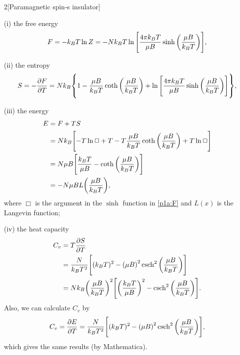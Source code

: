 \documentclass[12pt]{article}
\begin{document}
\begin{problem}{2}[Paramagnetic spin-s insulator]
\begin{solution}
(i) the free energy
\begin{equation}\label{p1a:F}
    F=-k_BT\ln Z=-Nk_BT\ln\qty[\frac{4\pi k_BT}{\mu B}\sinh\qty(\frac{\mu
    B}{k_BT})],
\end{equation}

(ii) the entropy
\begin{equation}
    S=-\frac{\partial F}{\partial T} 
    =Nk_B\qty{1-\frac{\mu B}{k_BT}\coth\qty(\frac{\mu B}{k_BT})
    +\ln\qty[\frac{4\pi k_BT}{\mu B}\sinh\qty(\frac{\mu B}{k_BT})]},
\end{equation}

(iii) the energy
\begin{align}\label{p2a:E}
    E
    &=F+TS\notag\\
    &=Nk_B\qty[-T\ln\Box+T-T\frac{\mu B}{k_BT}\coth\qty(\frac{\mu B}{k_BT})
    +T\ln\Box]\notag\\
    &=N\mu B\qty[\frac{k_BT}{\mu B}-\coth\qty(\frac{\mu B}{k_BT})]\notag\\
    &=-N\mu BL\qty(\frac{\mu B}{k_BT}),
\end{align}
where $\Box$ is the argument in the $\sinh$ function in \eqref{p1a:F} and
$L(x)$ is the Langevin function;

(iv) the heat capacity
\begin{align}
    C_v
    &=T\frac{\partial S}{\partial T} \notag\\
    &=\frac{N}{k_BT^2}\qty[(k_BT)^2-\qty(\mu B)^2\csch^2\qty(\frac{\mu
    B}{k_BT})]\notag\\
    &=Nk_B\qty(\frac{\mu B}{k_BT})^2\qty[\qty(\frac{k_BT}{\mu
    B})^2-\csch^2\qty(\frac{\mu B}{k_BT})].
\end{align}
Also, we can calculate $C_v$ by
\begin{align}
    C_v
    =\frac{\partial E}{\partial T}
    =\frac{N}{k_BT^2}\qty[(k_BT)^2-\qty(\mu B)^2\csch^2\qty(\frac{\mu
    B}{k_BT})],
\end{align}
which gives the same results (by Mathematica).


\end{solution}
\end{problem}
\end{document}

